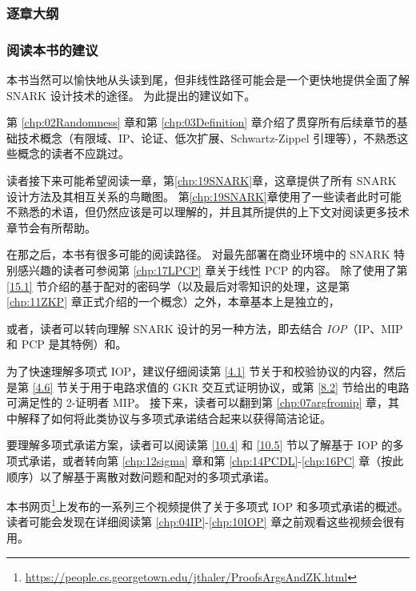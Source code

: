 \subsubsection{逐章大纲}
\subsubsection{阅读本书的建议} 本书当然可以愉快地从头读到尾，但非线性路径可能会是一个更快地提供全面了解 SNARK 设计技术的途径。 为此提出的建议如下。

第 \ref{chp:02Randomness} 章和第 \ref{chp:03Definition} 章介绍了贯穿所有后续章节的基础技术概念（有限域、IP、论证、低次扩展、Schwartz-Zippel 引理等），不熟悉这些概念的读者不应跳过。

读者接下来可能希望阅读一章，第\ref{chp:19SNARK}章，这章提供了所有 SNARK 设计方法及其相互关系的鸟瞰图。 第\ref{chp:19SNARK}章使用了一些读者此时可能不熟悉的术语，但仍然应该是可以理解的，并且其所提供的上下文对阅读更多技术章节会有所帮助。

在那之后，本书有很多可能的阅读路径。 对最先部署在商业环境中的 SNARK 特别感兴趣的读者可参阅第 \ref{chp:17LPCP} 章关于线性 PCP 的内容。 除了使用了第 \ref{15.1} 节介绍的基于配对的密码学（以及最后对零知识的处理，这是第 \ref{chp:11ZKP} 章正式介绍的一个概念）之外，本章基本上是独立的，

或者，读者可以转向理解 SNARK 设计的另一种方法，即去结合 \emph{IOP}（IP、MIP 和 PCP 是其特例）和。

为了快速理解多项式 IOP，建议仔细阅读第 \ref{4.1} 节关于和校验协议的内容，然后是第 \ref{4.6} 节关于用于电路求值的 GKR 交互式证明协议，或第 \ref{8.2} 节给出的电路可满足性的 2-证明者 MIP。 
接下来，读者可以翻到第 \ref{chp:07argfromip} 章，其中解释了如何将此类协议与多项式承诺结合起来以获得简洁论证。

要理解多项式承诺方案，读者可以阅读第 \ref{10.4} 和 \ref{10.5} 节以了解基于 IOP 的多项式承诺，或者转向第 \ref{chp:12sigma} 章和第 \ref{chp:14PCDL}-\ref{chp:16PC} 章（按此顺序）以了解基于离散对数问题和配对的多项式承诺。

本书网页\footnote{\url{https://people.cs.georgetown.edu/jthaler/ProofsArgsAndZK.html}}上发布的一系列三个视频提供了关于多项式 IOP 和多项式承诺的概述。 读者可能会发现在详细阅读第 \ref{chp:04IP}-\ref{chp:10IOP} 章之前观看这些视频会很有用。



